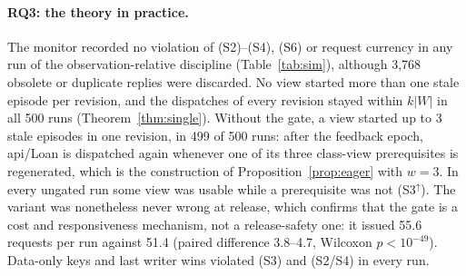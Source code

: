 \documentclass[pdflatex,sn-mathphys-num]{sn-jnl}
\theoremstyle{thmstyleone}%
\theoremstyle{thmstyletwo}%
\theoremstyle{thmstylethree}%
\newcommand{\vw}[1]{\textsf{#1}}
\newcommand{\SimRuns}{500}
\newcommand{\SimExactRequests}{51.4}
\newcommand{\SimExactDiscarded}{3,768}
\newcommand{\SimUngatedMaxEp}{3}
\newcommand{\SimUngatedMultiRuns}{499}
\newcommand{\SimUngatedRequests}{55.6}
\newcommand{\SimUngatedDiffLo}{3.8}
\newcommand{\SimUngatedDiffHi}{4.7}
\newcommand{\SimUngatedPexp}{-49}
\newcommand{\SimBoundOk}{500}
\begin{document}
\paragraph{RQ3: the theory in practice.} The monitor recorded no violation of (S2)--(S4), (S6) or request currency in any run of the observation-relative discipline (Table~\ref{tab:sim}), although \SimExactDiscarded{} obsolete or duplicate replies were discarded. No view started more than one stale episode per revision, and the dispatches of every revision stayed within $k|W|$ in all \SimBoundOk{} runs (Theorem~\ref{thm:single}). Without the gate, a view started up to \SimUngatedMaxEp{} stale episodes in one revision, in \SimUngatedMultiRuns{} of \SimRuns{} runs: after the feedback epoch, \vw{api/Loan} is dispatched again whenever one of its three class-view prerequisites is regenerated, which is the construction of Proposition~\ref{prop:eager} with $w=3$. In every ungated run some view was usable while a prerequisite was not (S3$^{\uparrow}$). The variant was nonetheless never wrong at release, which confirms that the gate is a cost and responsiveness mechanism, not a release-safety one: it issued \SimUngatedRequests{} requests per run against \SimExactRequests{} (paired difference \SimUngatedDiffLo--\SimUngatedDiffHi, Wilcoxon $p<10^{\SimUngatedPexp}$). Data-only keys and last writer wins violated (S3) and (S2/S4) in every run.
\end{document}
